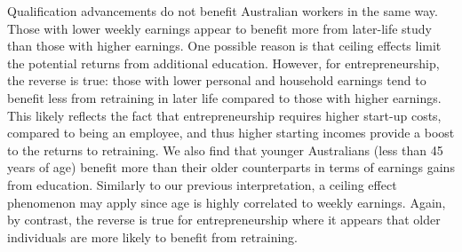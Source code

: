 \documentclass[12pt, a4paper]{article}
\begin{document}



Qualification advancements do not benefit Australian workers in the same way. Those with lower weekly earnings appear to benefit more from later-life study
than those with higher earnings. One possible reason is that ceiling effects
limit the potential returns from additional education. However, for entrepreneurship, the reverse is true: those with lower personal and household earnings tend to benefit less from retraining in later life compared to those with higher earnings. This likely reflects the fact that entrepreneurship requires higher start-up costs, compared to being an employee, and thus higher starting incomes provide a boost to the returns to retraining. We also find that
younger Australians (less than 45 years of age) benefit more than their older
counterparts in terms of earnings gains from education. Similarly to our previous interpretation, a ceiling effect phenomenon may apply since age is highly
correlated to weekly earnings. Again, by contrast, the reverse is true for entrepreneurship where it appears that older individuals are more likely to benefit from retraining.

\end{document}

